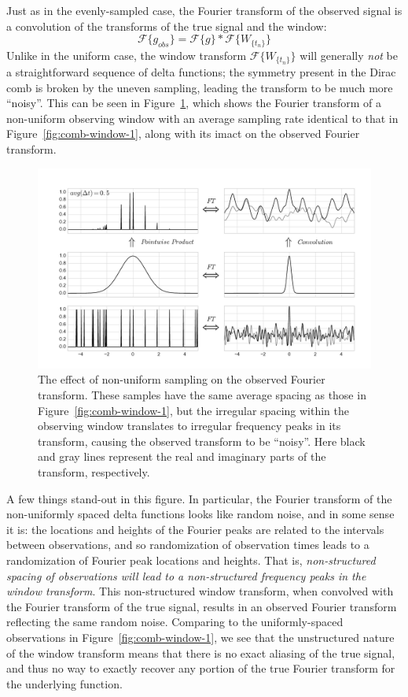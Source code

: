 \documentclass[preprint]{aastex}
\newcommand{\fig}[1]{Figure~\ref{fig:#1}}
\newcommand{\figlabel}[1]{\label{fig:#1}}
\newcommand{\eqlabel}[1]{\label{eq:#1}}
\begin{document}
Just as in the evenly-sampled case, the Fourier transform of the observed
signal is a convolution of the transforms of the true signal and the window:
\begin{equation}
  \mathcal{F}\{g_{obs}\} = \mathcal{F}\{g\} \ast \mathcal{F}\{W_{\{t_n\}}\}
  \eqlabel{g-obs-conv}
\end{equation}
Unlike in the uniform case, the window transform $\mathcal{F}\{W_{\{t_n\}}\}$
will generally {\it not} be a straightforward sequence of delta functions; the
symmetry present in the Dirac comb is broken by the uneven sampling,
leading the transform to be much more ``noisy''.
This can be seen in \fig{random-window}, which shows the Fourier transform of
a non-uniform observing window with an average sampling rate identical to
that in \fig{comb-window-1}, along with its imact on the observed Fourier
transform.

\begin{figure}[ht]
  \centering
  \includegraphics[width=\textwidth]{fig10_random_window}
  \caption{The effect of non-uniform sampling on the observed Fourier transform.
    These samples have the same average spacing as those in \fig{comb-window-1},
    but the irregular spacing within the observing window translates to
    irregular frequency peaks in its transform,
    causing the observed transform to be ``noisy''.
    Here black and gray lines represent the real and imaginary parts of the
    transform, respectively.
    \figlabel{random-window}}
\end{figure}

A few things stand-out in this figure. In particular, the Fourier transform of
the non-uniformly spaced delta functions looks like random noise, and in some
sense it is: the locations and heights of the Fourier peaks are related to
the intervals between observations, and so randomization of observation times
leads to a randomization of Fourier peak locations and heights.
That is, {\it non-structured spacing of observations will lead to
a non-structured frequency peaks in the window transform}.
This non-structured window transform, when convolved with the Fourier transform
of the true signal, results in an observed Fourier transform reflecting the
same random noise.
Comparing to the uniformly-spaced observations in \fig{comb-window-1}, we
see that the unstructured nature of the window transform means that there
is no exact aliasing of the true signal, and thus no way to exactly recover
any portion of the true Fourier transform for the underlying function.
\end{document}
